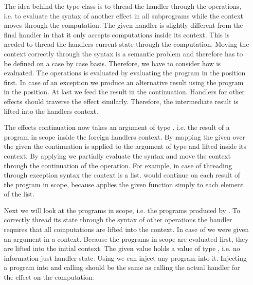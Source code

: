 The idea behind the  type class is to thread the handler
through the operations, i.e. to evaluate the syntax of another effect in all
subprograms while the context moves through the computation.
The given handler  is slightly different from the final
handler in that it only accepts computations inside its context.
This is needed to thread the handlers current state through the computation.
Moving the context correctly through the syntax is a semantic problem and
therefore has to be defined on a case by case basis.
Therefore, we have to consider how  is evaluated.
The  operations is evaluated by evaluating the program in
the  position first.
In case of an exception we produce an alternative result using the program in
the  position.
At last we feed the result in the continuation.
Handlers for other effects should traverse the effect similarly.
Therefore, the intermediate result is lifted into the handlers context.

The effects continuation  now takes an argument of type
, i.e. the result of a program in scope inside the foreign
handlers context.
By mapping the given  over the given  the
continuation is applied to the argument of type  and lifted
inside its context.
By applying  we partially evaluate the syntax and move the
context through the continuation of the operation.
For example, in case of threading  through exception
syntax the context is a list.
 would continue on each result of the program in scope,
because \AgdaFunction{<\$>} applies the given function simply to each element of
the list.

Next we will look at the programs in scope, i.e. the programs produced by
.
To correctly thread its state through the syntax of other operations the handler
requires that all computations are lifted into the context.
In case of  we were given an argument in a context.
Because the programs in scope are evaluated first, they are lifted into the
initial context.
The given value  holds a value of type , i.e.
no information just handler state.
Using \AgdaFunction{<\$} we can inject any program into it.
Injecting a program into  and calling 
should be the same as calling the actual handler for the effect on the
computation.

